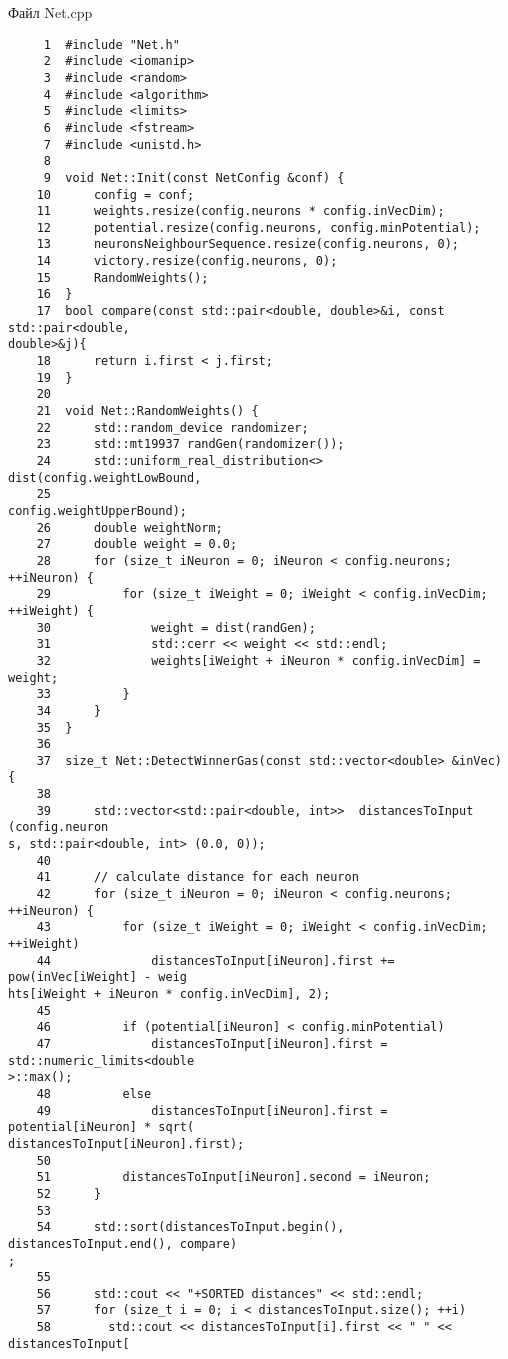 Файл Net.cpp
\begin{verbatim}
     1	#include "Net.h"
     2	#include <iomanip>
     3	#include <random>
     4	#include <algorithm>
     5	#include <limits>
     6	#include <fstream>
     7	#include <unistd.h>
     8	
     9	void Net::Init(const NetConfig &conf) {
    10	    config = conf;
    11	    weights.resize(config.neurons * config.inVecDim);
    12	    potential.resize(config.neurons, config.minPotential);
    13	    neuronsNeighbourSequence.resize(config.neurons, 0);
    14	    victory.resize(config.neurons, 0);
    15	    RandomWeights();
    16	}
    17	bool compare(const std::pair<double, double>&i, const std::pair<double, 
double>&j){ 
    18	    return i.first < j.first; 
    19	}
    20	
    21	void Net::RandomWeights() {
    22	    std::random_device randomizer;
    23	    std::mt19937 randGen(randomizer());
    24	    std::uniform_real_distribution<> dist(config.weightLowBound, 
    25	                                          config.weightUpperBound);
    26	    double weightNorm;
    27	    double weight = 0.0;
    28	    for (size_t iNeuron = 0; iNeuron < config.neurons; ++iNeuron) {
    29	        for (size_t iWeight = 0; iWeight < config.inVecDim; ++iWeight) {
    30	            weight = dist(randGen);
    31	            std::cerr << weight << std::endl;
    32	            weights[iWeight + iNeuron * config.inVecDim] = weight;
    33	        }
    34	    }
    35	}
    36	
    37	size_t Net::DetectWinnerGas(const std::vector<double> &inVec) {
    38	
    39	    std::vector<std::pair<double, int>>  distancesToInput (config.neuron
s, std::pair<double, int> (0.0, 0));
    40	
    41	    // calculate distance for each neuron
    42	    for (size_t iNeuron = 0; iNeuron < config.neurons; ++iNeuron) {
    43	        for (size_t iWeight = 0; iWeight < config.inVecDim; ++iWeight) 
    44	            distancesToInput[iNeuron].first += pow(inVec[iWeight] - weig
hts[iWeight + iNeuron * config.inVecDim], 2);
    45	
    46	        if (potential[iNeuron] < config.minPotential)
    47	            distancesToInput[iNeuron].first = std::numeric_limits<double
>::max();
    48	        else 
    49	            distancesToInput[iNeuron].first = potential[iNeuron] * sqrt(
distancesToInput[iNeuron].first);
    50	
    51	        distancesToInput[iNeuron].second = iNeuron;
    52	    }
    53	
    54	    std::sort(distancesToInput.begin(), distancesToInput.end(), compare)
;
    55	
    56	    std::cout << "+SORTED distances" << std::endl;
    57	    for (size_t i = 0; i < distancesToInput.size(); ++i)
    58	      std::cout << distancesToInput[i].first << " " << distancesToInput[

\end{verbatim}
